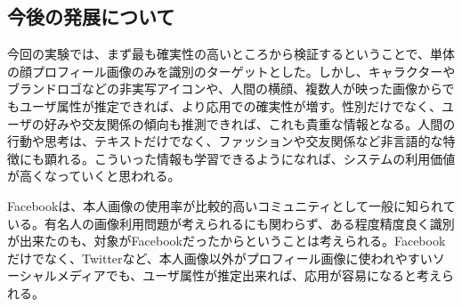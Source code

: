 \subsection{今後の発展について}
今回の実験では、まず最も確実性の高いところから検証するということで、単体の顔プロフィール画像のみを識別のターゲットとした。しかし、キャラクターやブランドロゴなどの非実写アイコンや、人間の横顔、複数人が映った画像からでもユーザ属性が推定できれば、より応用での確実性が増す。性別だけでなく、ユーザの好みや交友関係の傾向も推測できれば、これも貴重な情報となる。人間の行動や思考は、テキストだけでなく、ファッションや交友関係など非言語的な特徴にも顕れる。こういった情報も学習できるようになれば、システムの利用価値が高くなっていくと思われる。\par
Facebookは、本人画像の使用率が比較的高いコミュニティとして一般に知られている。有名人の画像利用問題が考えられるにも関わらず、ある程度精度良く識別が出来たのも、対象がFacebookだったからということは考えられる。Facebookだけでなく、Twitterなど、本人画像以外がプロフィール画像に使われやすいソーシャルメディアでも、ユーザ属性が推定出来れば、応用が容易になると考えられる。
